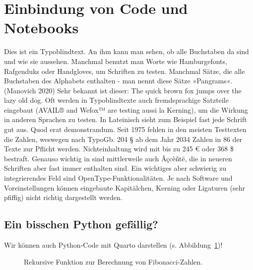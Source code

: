 \documentclass[
  letterpaper,
  DIV=11]{scrartcl}
\newenvironment{Shaded}{\begin{snugshade}}{\end{snugshade}}
\newcommand{\ControlFlowTok}[1]{\textcolor[rgb]{0.00,0.23,0.31}{#1}}
\newcommand{\DecValTok}[1]{\textcolor[rgb]{0.68,0.00,0.00}{#1}}
\newcommand{\KeywordTok}[1]{\textcolor[rgb]{0.00,0.23,0.31}{#1}}
\newcommand{\NormalTok}[1]{\textcolor[rgb]{0.00,0.23,0.31}{#1}}
\newcommand{\OperatorTok}[1]{\textcolor[rgb]{0.37,0.37,0.37}{#1}}
\newcommand{\PreprocessorTok}[1]{\textcolor[rgb]{0.68,0.00,0.00}{#1}}
\newcommand{\StringTok}[1]{\textcolor[rgb]{0.13,0.47,0.30}{#1}}
\begin{document}
\section{Einbindung von Code und
Notebooks}\label{einbindung-von-code-und-notebooks}

Dies ist ein Typoblindtext. An ihm kann man sehen, ob alle Buchstaben da
sind und wie sie aussehen. Manchmal benutzt man Worte wie Hamburgefonts,
Rafgenduks oder Handgloves, um Schriften zu testen. Manchmal Sätze, die
alle Buchstaben des Alphabets enthalten - man nennt diese Sätze
»Pangrams«.(Manovich 2020) Sehr bekannt ist dieser: The quick brown fox
jumps over the lazy old dog. Oft werden in Typoblindtexte auch
fremdsprachige Satzteile eingebaut (AVAIL® and Wefox™ are testing aussi
la Kerning), um die Wirkung in anderen Sprachen zu testen. In Lateinisch
sieht zum Beispiel fast jede Schrift gut aus. Quod erat demonstrandum.
Seit 1975 fehlen in den meisten Testtexten die Zahlen, weswegen nach
TypoGb. 204 § ab dem Jahr 2034 Zahlen in 86 der Texte zur Pflicht
werden. Nichteinhaltung wird mit bis zu 245 € oder 368 \$ bestraft.
Genauso wichtig in sind mittlerweile auch Âçcèñtë, die in neueren
Schriften aber fast immer enthalten sind. Ein wichtiges aber schwierig
zu integrierendes Feld sind OpenType-Funktionalitäten. Je nach Software
und Voreinstellungen können eingebaute Kapitälchen, Kerning oder
Ligaturen (sehr pfiffig) nicht richtig dargestellt werden.

\subsection{Ein bisschen Python
gefällig?}\label{ein-bisschen-python-gefuxe4llig}

Wir können auch Python-Code mit Quarto darstellen (s.
Abbildung~\ref{fig-fibo})!

\begin{figure}

\centering{

\begin{Shaded}
\begin{Highlighting}[]
\KeywordTok{def}\NormalTok{ fib(n):}
    \ControlFlowTok{if}\NormalTok{ n }\OperatorTok{\textless{}} \DecValTok{1}\NormalTok{:}
        \ControlFlowTok{raise} \PreprocessorTok{Exception}\NormalTok{(}\StringTok{\textquotesingle{}undefined\textquotesingle{}}\NormalTok{)}
    \ControlFlowTok{elif}\NormalTok{ n }\OperatorTok{\textless{}} \DecValTok{3}\NormalTok{:}
        \ControlFlowTok{return} \DecValTok{1}
    \ControlFlowTok{else}\NormalTok{:}
        \ControlFlowTok{return}\NormalTok{ fib(n}\OperatorTok{{-}}\DecValTok{1}\NormalTok{) }\OperatorTok{+}\NormalTok{ fib(n}\OperatorTok{{-}}\DecValTok{2}\NormalTok{)}
\end{Highlighting}
\end{Shaded}

}

\caption{\label{fig-fibo}Rekursive Funktion zur Berechnung von
Fibonacci-Zahlen.}

\end{figure}%
\end{document}
